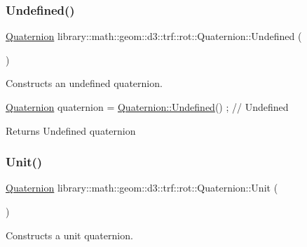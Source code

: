 \subsubsection{\texorpdfstring{Undefined()}{Undefined()}}
{\footnotesize\ttfamily \hyperlink{classlibrary_1_1math_1_1geom_1_1d3_1_1trf_1_1rot_1_1_quaternion}{Quaternion} library\+::math\+::geom\+::d3\+::trf\+::rot\+::\+Quaternion\+::\+Undefined (\begin{DoxyParamCaption}{ }\end{DoxyParamCaption})\hspace{0.3cm}{\ttfamily [static]}}



Constructs an undefined quaternion. 


\begin{DoxyCode}
\hyperlink{classlibrary_1_1math_1_1geom_1_1d3_1_1trf_1_1rot_1_1_quaternion_a1b8794cce68c5ee86dd50f9ba53635fa}{Quaternion} quaternion = \hyperlink{classlibrary_1_1math_1_1geom_1_1d3_1_1trf_1_1rot_1_1_quaternion_a618d43e30f188e3b251bd0a6b370d30f}{Quaternion::Undefined}() ; \textcolor{comment}{// Undefined}
\end{DoxyCode}


\begin{DoxyReturn}{Returns}
Undefined quaternion 
\end{DoxyReturn}
\mbox{\label{classlibrary_1_1math_1_1geom_1_1d3_1_1trf_1_1rot_1_1_quaternion_a8076524c66a805b16dffc27efd11e245}} 
\subsubsection{\texorpdfstring{Unit()}{Unit()}}
{\footnotesize\ttfamily \hyperlink{classlibrary_1_1math_1_1geom_1_1d3_1_1trf_1_1rot_1_1_quaternion}{Quaternion} library\+::math\+::geom\+::d3\+::trf\+::rot\+::\+Quaternion\+::\+Unit (\begin{DoxyParamCaption}{ }\end{DoxyParamCaption})\hspace{0.3cm}{\ttfamily [static]}}



Constructs a unit quaternion. 


